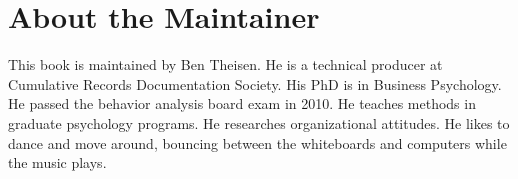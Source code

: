 \chapter{About the Maintainer}

This book is maintained by Ben Theisen. He is a technical producer at Cumulative Records Documentation Society. His PhD is in Business Psychology. He passed the behavior analysis board exam in 2010. He teaches methods in graduate psychology programs. He researches organizational attitudes. He likes to dance and move around, bouncing between the whiteboards and computers while the music plays. 
\clearpage
